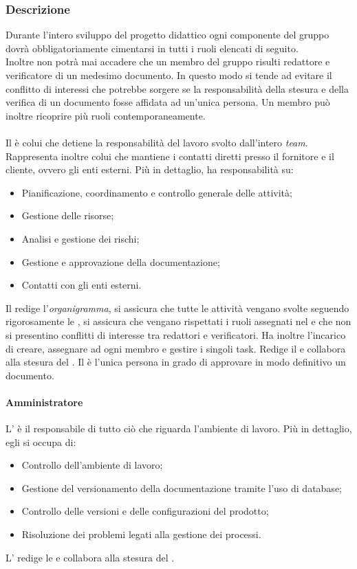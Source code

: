 \subsubsection{Descrizione}
Durante l'intero sviluppo del progetto didattico ogni componente del gruppo
dovrà obbligatoriamente cimentarsi in tutti i ruoli elencati di seguito. \\
Inoltre non potrà mai accadere che un membro del gruppo risulti redattore e verificatore di un medesimo documento.
In questo modo si tende ad evitare il conflitto di interessi che potrebbe sorgere se la responsabilità della stesura e della verifica di un documento fosse affidata ad un'unica persona.
Un membro può inoltre ricoprire più ruoli contemporaneamente.

\paragraph{\RdP}
Il \textit{\RdP} è colui che detiene la responsabilità del
lavoro svolto dall'intero \textit{team}. Rappresenta inoltre colui che mantiene i
contatti diretti presso il fornitore e il cliente, ovvero gli enti esterni. Più
in dettaglio, ha responsabilità su:
\begin{itemize}
  \item Pianificazione, coordinamento e controllo generale delle attività;
  \item Gestione delle risorse;
  \item Analisi e gestione dei rischi;
  \item Gestione e approvazione della documentazione;
  \item Contatti con gli enti esterni.
\end{itemize}
Il \textit{\RdP} redige l'\textit{organigramma}, si assicura che
tutte le attività vengano svolte seguendo rigorosamente le \textit{\NdP}, si
assicura che vengano rispettati i ruoli assegnati nel \textit{\PdP} e che non si
presentino conflitti di interesse tra redattori e verificatori. Ha inoltre
l'incarico di creare, assegnare ad ogni membro e gestire i singoli task. Redige
il \textit{\PdP} e collabora alla stesura del \textit{\PdQ}. Il \textit{\RdP} è
l'unica persona in grado di approvare in modo definitivo un documento.

\paragraph{Amministratore}
L'\textit{\Amm} è il responsabile di tutto ciò che riguarda l'ambiente di
lavoro. Più in dettaglio, egli si occupa di:
\begin{itemize}
  \item Controllo dell'ambiente di lavoro;
  \item Gestione del versionamento della documentazione tramite l'uso di
  database;
  \item Controllo delle versioni e delle configurazioni del prodotto;
  \item Risoluzione dei problemi legati alla gestione dei processi.
\end{itemize}
L'\textit{\Amm} redige le \textit{\NdP} e collabora alla stesura del
\textit{\PdP}.

